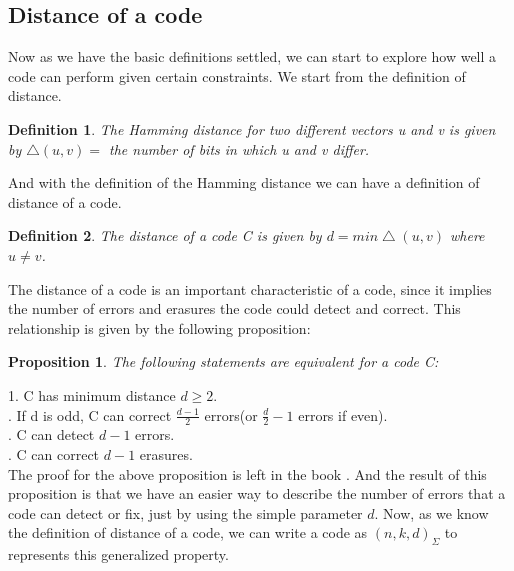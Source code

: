 \documentclass{article}
\newtheorem{Definition}{Definition}
\newtheorem{Proposition}{Proposition}
\begin{document}
\subsection{Distance of a code}
Now as we have the basic definitions settled, we can start to explore how well a code can perform given certain constraints. We start from the definition of distance.
\begin{Definition}The Hamming distance for two different vectors u and v is given by $\bigtriangleup(u,v) = $ the number of bits in which u and v differ.
\end{Definition}
\noindent And with the definition of the Hamming distance we can have a definition of distance of a code.
\begin{Definition}
The distance of a code C is given by $d = min \bigtriangleup (u,v)$ where $u \neq v$.
\end{Definition}
\noindent The distance of a code is an important characteristic of a code, since it implies the number of errors and erasures the code could detect and correct. This relationship is given by the following proposition:
\begin{Proposition}The following statements are equivalent for a code C:\end{Proposition}
1. \quad C has minimum distance $d \ge 2$.\\
. \quad If d is odd, C can correct $\frac{d-1}{2}$ errors(or $\frac{d}{2}-1$ errors if even).\\
. \quad C can detect $d-1$ errors.\\
. \quad C can correct $d-1$ erasures.\\
The proof for the above proposition is left in the book \cite{book}. And the result of this proposition is that we have an easier way to describe the number of errors that a code can detect or fix, just by using the simple parameter $d$. Now, as we know the definition of distance of a code, we can write a code as $(n,k,d)_\Sigma$ to represents this generalized property.
\end{document}
